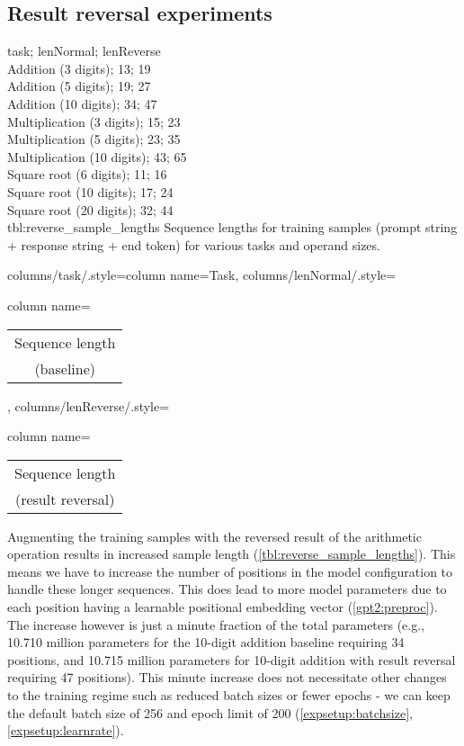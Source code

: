 \subsection{Result reversal experiments}
{
	task; lenNormal; lenReverse\\
	Addition (3 digits); 13; 19 \\
	Addition (5 digits); 19; 27 \\
	Addition (10 digits); 34; 47 \\
	Multiplication (3 digits); 15; 23 \\
	Multiplication (5 digits); 23; 35 \\
	Multiplication (10 digits); 43; 65 \\
	Square root (6 digits); 11; 16 \\
	Square root (10 digits); 17; 24 \\
	Square root (20 digits); 32; 44 \\
}
{tbl:reverse_sample_lengths}
{
	Sequence lengths for training samples (prompt string + response string + end token) for various tasks and operand sizes.
}
{%
	columns/task/.style={column name={Task}},
	columns/lenNormal/.style={column name={\begin{tabular}{c} Sequence length \\ (baseline) \\ \end{tabular}}},
	columns/lenReverse/.style={column name={\begin{tabular}{c} Sequence length \\ (result reversal) \\ \end{tabular}}}
}

Augmenting the training samples with the reversed result of the arithmetic operation results in increased sample length (\cref{tbl:reverse_sample_lengths}).
This means we have to increase the number of positions in the model configuration to handle these longer sequences. This does lead to more model parameters due to each position having a learnable positional embedding vector (\cref{gpt2:preproc}). The increase however is just a minute fraction of the total parameters (e.g., 10.710 million parameters for the 10-digit addition baseline requiring 34 positions, and 10.715 million parameters for 10-digit addition with result reversal requiring 47 positions). This minute increase does not necessitate other changes to the training regime such as reduced batch sizes or fewer epochs - we can keep the default batch size of 256 and epoch limit of 200 (\cref{expsetup:batchsize}, \cref{expsetup:learnrate}).

